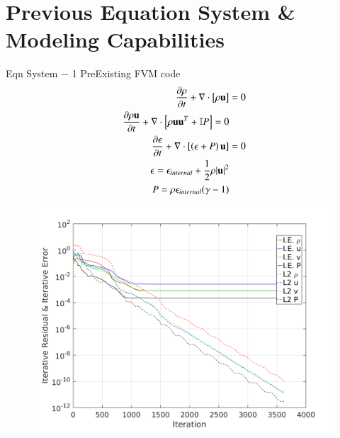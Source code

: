 \section{Previous Equation System \& Modeling Capabilities}

\begin{frame}[t]{Eqn System $-$ 1 PreExisting FVM code}
  \minipage{\textwidth}
  \begin{align*}
    \frac{\partial \rho}{\partial t} + \nabla \cdot \left[\rho \mathbf{u}\right] &= 0 \\
    \frac{\partial \rho \mathbf{u}}{\partial t} + \nabla \cdot \left[\rho \mathbf{u}\mathbf{u}^T + \mathbb{I}P\right] = 0 \\
    \frac{\partial \epsilon}{\partial t} + \nabla \cdot \left[\left(\epsilon + P \right)\mathbf{u}\right] &= 0 \\
    \epsilon = \epsilon_{internal} + \frac{1}{2}\rho|\mathbf{u}|^2 &\\
    P = \rho \epsilon_{internal} (\gamma - 1) &
  \end{align*}
  \endminipage\hfill
 \begin{figure}[!htbp]
   \includegraphics[width=1.0\linewidth]{fig/Iter_SB}
   \centering
 \end{figure}

  \endminipage\hfill
  \endminipage

\end{frame}

